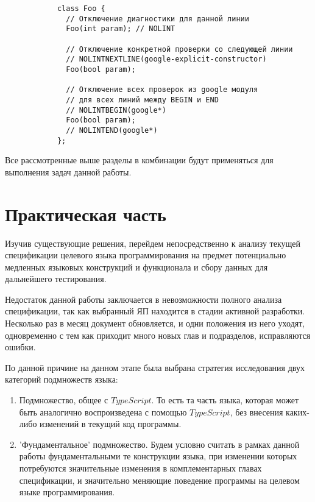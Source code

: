 \documentclass{mipt-thesis-bs}
\begin{document}
\begin{verbatim}
            class Foo {
              // Отключение диагностики для данной линии
              Foo(int param); // NOLINT

              // Отключение конкретной проверки со следующей линии
              // NOLINTNEXTLINE(google-explicit-constructor)
              Foo(bool param);

              // Отключение всех проверок из google модуля
              // для всех линий между BEGIN и END
              // NOLINTBEGIN(google*)
              Foo(bool param);
              // NOLINTEND(google*)
            };
\end{verbatim}

Все рассмотренные выше разделы в комбинации будут применяться для выполнения задач 
данной работы.

\chapter{Практическая часть}

Изучив существующие решения, перейдем непосредственно к анализу текущей спецификации
целевого языка программирования на предмет потенциально медленных языковых конструкций и функционала и
сбору данных для дальнейшего тестирования.

Недостаток данной работы заключается в невозможности полного анализа спецификации, так как 
выбранный ЯП находится в стадии активной разработки. Несколько раз в месяц документ обновляется, и одни 
положения из него уходят, одновременно с тем как приходит много новых глав и подразделов, исправляются 
ошибки.

По данной причине на данном этапе была выбрана стратегия исследования двух категорий 
подмножеств языка:

\begin{enumerate}
    \item Подмножество, общее с $TypeScript$. То есть та часть языка, которая может быть аналогично
    воспроизведена с помощью $TypeScript$, без внесения каких-либо изменений в текущий код программы.
    \item 'Фундаментальное' подмножество. Будем условно считать в рамках данной работы фундаментальными
    те конструкции языка, при изменении которых потребуются значительные изменения в
    комплементарных главах спецификации, и значительно меняющие поведение 
    программы на целевом языке программирования.
\end{enumerate}
\end{document}
